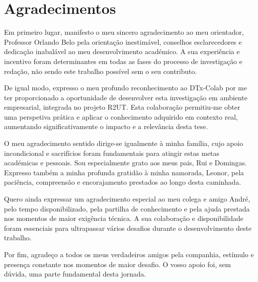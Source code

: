 \chapter*{Agradecimentos}
\setlength{\parskip}{1em}

Em primeiro lugar, manifesto o meu sincero agradecimento ao meu orientador, Professor Orlando Belo pela orientação inestimável, conselhos esclarecedores e dedicação inabalável ao meu desenvolvimento académico. A sua experiência e incentivo foram determinantes em todas as fases do processo de investigação e redação, não sendo este trabalho possível sem o seu contributo.

De igual modo, expresso o meu profundo reconhecimento ao DTx-Colab por me ter proporcionado a oportunidade de desenvolver esta investigação em ambiente empresarial, integrada no projeto R2UT. Esta colaboração permitiu-me obter uma perspetiva prática e aplicar o conhecimento adquirido em contexto real, aumentando significativamente o impacto e a relevância desta tese.

O meu agradecimento sentido dirige-se igualmente à minha família, cujo apoio incondicional e sacrifícios foram fundamentais para atingir estas metas académicas e pessoais. Sou especialmente grato aos meus pais, Rui e Domingas. Expresso também a minha profunda gratidão à minha namorada, Leonor, pela paciência, compreensão e encorajamento prestados ao longo desta caminhada.

Quero ainda expressar um agradecimento especial ao meu colega e amigo André, pelo tempo disponibilizado, pela partilha de conhecimento e pela ajuda prestada nos momentos de maior exigência técnica. A sua colaboração e disponibilidade foram essenciais para ultrapassar vários desafios durante o desenvolvimento deste trabalho.

Por fim, agradeço a todos os meus verdadeiros amigos pela companhia, estímulo e presença constante nos momentos de maior desafio. O vosso apoio foi, sem dúvida, uma parte fundamental desta jornada.

\setlength{\parskip}{0em}